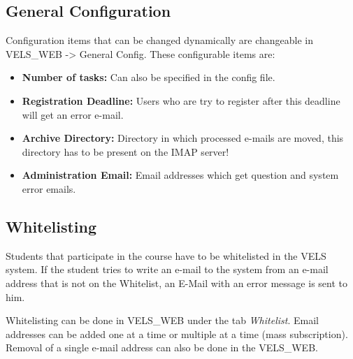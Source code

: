 \subsection{General Configuration}\label{sub:generalconfig}
Configuration items that can be changed dynamically are changeable in VELS\_WEB ->
General Config. These configurable items are:
\begin{itemize}
\item {\bf Number of tasks: }Can also be specified in the config file.
\item {\bf Registration Deadline: } Users who are try to register after this deadline will
    get an error e-mail.
\item {\bf Archive Directory: } Directory in which processed e-mails are moved, this
    directory has to be present on the IMAP server!
\item {\bf Administration Email: } Email addresses which get question and system error emails.

\end{itemize}

\subsection{Whitelisting} \label{sub:whitelisting}
Students that participate in the course have to be whitelisted in the VELS system. If the student
tries to write an e-mail to the system from an e-mail address that is not on the Whitelist, an E-Mail
with an error message is sent to him.

Whitelisting can be done in VELS\_WEB under the tab {\it Whitelist}. Email addresses can be added
one at a time or multiple at a time (mass subscription). Removal of a single e-mail address
can also be done in the VELS\_WEB.

